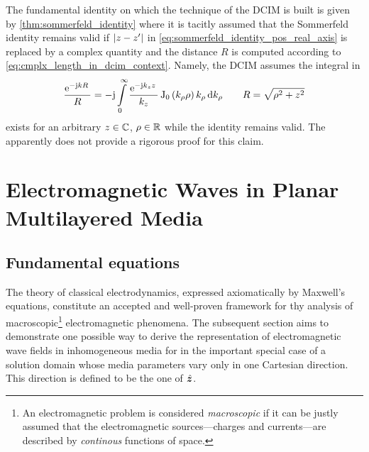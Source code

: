 The fundamental identity on which the technique of the \ac{DCIM} is built is
given by \cref{thm:sommerfeld_identity} \cite{Fang1988} where it is tacitly
assumed that the Sommerfeld identity remains valid if $\left\vert z-z^\prime\right\vert$ in
\eqref{eq:sommerfeld_identity_pos_real_axis} is replaced by a complex quantity
and the distance $R$ is computed according to
\eqref{eq:cmplx_length_in_dcim_context}.
Namely, the \ac{DCIM} assumes the integral in
\begin{equation}\label{eq:sommerfeld_identity_complex_z}
	\frac{\mathrm{e}^{-\mathrm{j} k R}\,}{R} = 
	-\mathrm{j}
	\int\limits_{0}^{\infty} 
	\frac{\mathrm{e}^{-\mathrm{j} k_z z}\,}{k_z}
	\operatorname{J}_{0} \left(k_\rho \rho\right)
	k_\rho 
	\,
	\mathrm{d} k_\rho
	\qquad
	R = \sqrt{\rho^2 + z^2}
\end{equation}
exists for an arbitrary $z \in \mathbb{C}$, $\rho \in \mathbb{R}$ while the identity remains
valid.
The apparently does not provide a rigorous proof for this claim.













\chapter{Electromagnetic Waves in Planar Multilayered Media}
\label{ch:em_case}







\section{Fundamental equations}
\label{sec:em_fundamental_equations}

The theory of classical electrodynamics, expressed axiomatically by Maxwell's
equations, constitute an accepted and well-proven framework for thy analysis of
macroscopic\footnote{An electromagnetic problem is considered \emph{macroscopic}
if it can be justly assumed that the electromagnetic sources---charges and
currents---are described by \emph{continous} functions of space.}
electromagnetic phenomena.
The subsequent section aims to demonstrate one possible way to derive the
representation of electromagnetic wave fields in inhomogeneous media for in the
important special case of a solution domain whose media parameters vary only in
one Cartesian direction.
This direction is defined to be the one of $\uv{z}$.


